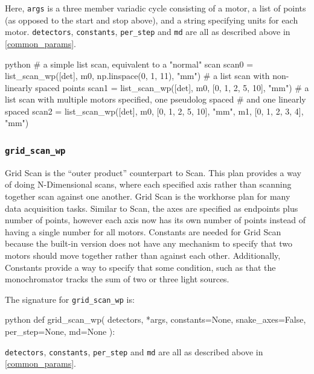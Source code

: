 Here, \texttt{args} is a three member variadic cycle consisting of a motor, a list of points (as opposed to the start and stop above), and a string specifying units for each motor.
\texttt{detectors}, \texttt{constants}, \texttt{per\_step} and \texttt{md} are all as described above in \ref{common_params}.

\begin{codefragment}{python}
# a simple list scan, equivalent to a "normal" scan
scan0 = list_scan_wp([det], m0, np.linspace(0, 1, 11), "mm")
# a list scan with non-linearly spaced points
scan1 = list_scan_wp([det], m0, [0, 1,  2, 5, 10], "mm")
# a list scan with multiple motors specified, one pseudolog spaced
# and one linearly spaced
scan2 = list_scan_wp([det], m0, [0, 1, 2, 5, 10], "mm",
	                    m1, [0, 1, 2, 3, 4], "mm")
\end{codefragment}

\subsubsection{\texttt{grid\_scan\_wp}}

Grid Scan is the ``outer product'' counterpart to Scan.
This plan provides a way of doing N-Dimensional scans, where each specified axis rather than scanning together scan against one another.
Grid Scan is the workhorse plan for many data acquisition tasks.
Similar to Scan, the axes are specified as endpoints plus number of points, however each axis now has its own number of points instead of having a single number for all motors.
Constants are needed for Grid Scan because the built-in version does not have any mechanism to specify that two motors should move together rather than against each other.
Additionally, Constants provide a way to specify that some condition, such as that the monochromator tracks the sum of two or three light sources.

The signature for \texttt{grid\_scan\_wp} is:

\begin{codefragment}{python}
def grid_scan_wp(
    detectors, *args, constants=None, snake_axes=False, per_step=None, md=None
):
\end{codefragment}

\texttt{detectors}, \texttt{constants}, \texttt{per\_step} and \texttt{md} are all as described above in \ref{common_params}.

